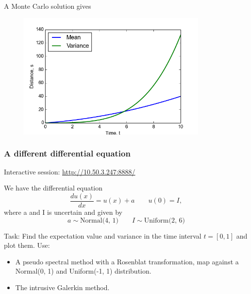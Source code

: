 \documentclass{beamer}
\begin{document}
\begin{frame}{A Monte Carlo solution gives}
 \begin{figure}
  \includegraphics[width=0.85\textwidth]{solution2.png}
 \end{figure}

\end{frame}


\begin{frame}
\frametitle{A different differential equation}
   \begin{alert}{Interactive session:}
\href{http://10.50.3.247:8888/}{http://10.50.3.247:8888/}\newline
  \end{alert}
  
  
We have the differential equation 
\[\frac{d u(x)}{dx} = u(x) + a \qquad u(0) = I,\]
where a and I is uncertain and given by
\[a\sim \text{Normal(4, 1)}\qquad I\sim \text{Uniform(2, 6)}\]
\begin{alert}{Task:}
Find the expectation value and variance in the time interval $t=[0,1]$  and plot them. Use:
\begin{itemize}
 \item A pseudo spectral method with a Rosenblat transformation, map against a Normal(0, 1) and Uniform(-1, 1) distribution.
 \item The intrusive Galerkin method.
\end{itemize}

\end{alert}
\end{frame}
\end{document}
